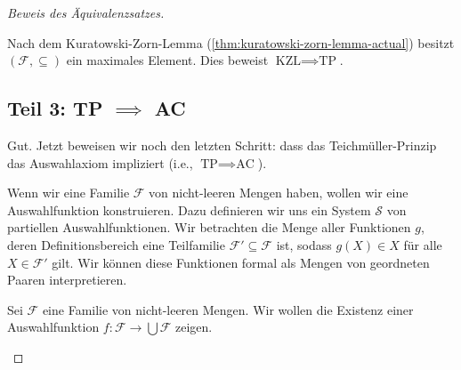 \begin{proof}[Beweis des Äquivalenzsatzes]
\begin{math-stroke}
\begin{short-proof}
Nach dem Kuratowski-Zorn-Lemma (\cref{thm:kuratowski-zorn-lemma-actual}) besitzt $(\mathcal{F}, \subseteq)$ ein maximales Element. Dies beweist $\text{KZL} \implies \text{TP}$.
\end{short-proof}
\end{math-stroke}

\subsection{Teil 3: TP \texorpdfstring{$\implies$}{implies} AC}
\begin{spoken-clean}[01:26:34 - 01:28:40]
Gut. Jetzt beweisen wir noch den letzten Schritt: dass das Teichmüller-Prinzip das Auswahlaxiom impliziert (i.e., $\text{TP} \implies \text{AC}$).

Wenn wir eine Familie $\mathcal{F}$ von nicht-leeren Mengen haben, wollen wir eine Auswahlfunktion konstruieren. Dazu definieren wir uns ein System $\mathcal{S}$ von partiellen Auswahlfunktionen. Wir betrachten die Menge aller Funktionen $g$, deren Definitionsbereich eine Teilfamilie $\mathcal{F}' \subseteq \mathcal{F}$ ist, sodass $g(X) \in X$ für alle $X \in \mathcal{F}'$ gilt. Wir können diese Funktionen formal als Mengen von geordneten Paaren interpretieren.
\end{spoken-clean}

\begin{math-stroke}
\begin{short-proof}
Sei $\mathcal{F}$ eine Familie von nicht-leeren Mengen. Wir wollen die Existenz einer Auswahlfunktion $f \colon \mathcal{F} \to \bigcup \mathcal{F}$ zeigen.


\end{short-proof}
\end{math-stroke}
\end{proof}
